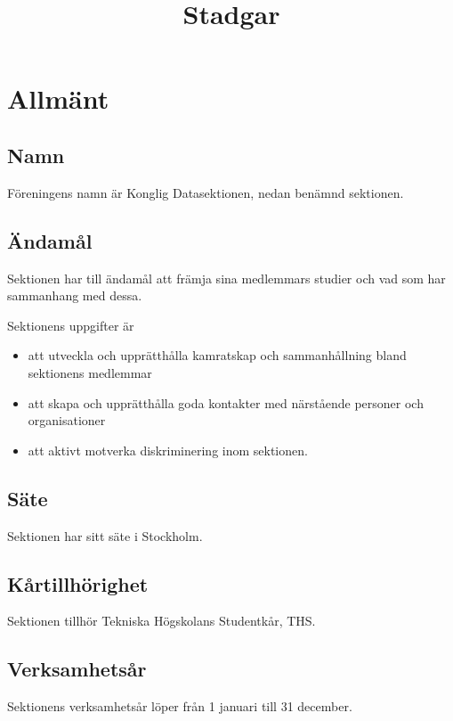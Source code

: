 \documentclass[a4paper,12pt]{article}
\title{Stadgar}
\begin{document}
\maketitle

\section{Allmänt}

\subsection{Namn}
\label{sec:namn}

Föreningens namn är Konglig Datasektionen, nedan benämnd sektionen.

\subsection{Ändamål}

Sektionen har till ändamål att främja sina medlemmars studier och vad som har sammanhang med dessa.

Sektionens uppgifter är

\begin{itemize}
  \item att utveckla och upprätthålla kamratskap och sammanhållning bland sektionens medlemmar
  \item att skapa och upprätthålla goda kontakter med närstående personer och organisationer
  \item att aktivt motverka diskriminering inom sektionen.
\end{itemize}

\subsection{Säte}

Sektionen har sitt säte i Stockholm.

\subsection{Kårtillhörighet}

Sektionen tillhör Tekniska Högskolans Studentkår, THS.

\subsection{Verksamhetsår}

Sektionens verksamhetsår löper från 1 januari till 31 december.
\end{document}
